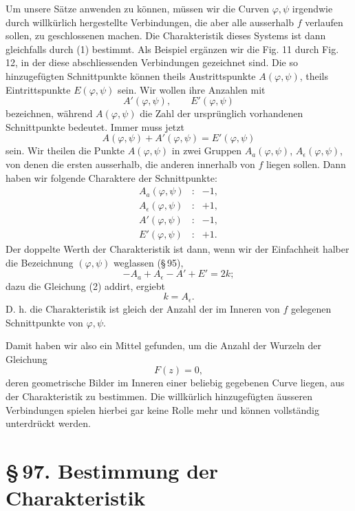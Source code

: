 \documentclass[11pt]{article}
\providecommand{\sect}[2]{\section*{\S\,#1. #2}}
\begin{document}
Um unsere Sätze anwenden zu können, müssen wir die Curven $\varphi,\psi$ irgendwie durch willkürlich hergestellte Verbindungen, die aber alle ausserhalb $f$ verlaufen sollen, zu geschlossenen machen. Die Charakteristik dieses Systems ist dann gleichfalls durch (1) bestimmt. Als Beispiel ergänzen wir die Fig. 11 durch Fig. 12, in der diese abschliessenden Verbindungen gezeichnet sind. Die so hinzugefügten Schnittpunkte können theils Austrittspunkte $A(\varphi,\psi)$, theils Eintrittspunkte $E(\varphi,\psi)$ sein. Wir wollen ihre Anzahlen mit
\[
        A'(\varphi,\psi),\qquad E'(\varphi,\psi)
\]
bezeichnen, während $A(\varphi,\psi)$ die Zahl der ursprünglich vorhandenen Schnittpunkte bedeutet. Immer muss jetzt
\begin{equation}
        A(\varphi,\psi)+A'(\varphi,\psi)=E'(\varphi,\psi)
\tag{2}
\end{equation}
sein. Wir theilen die Punkte $A(\varphi,\psi)$ in zwei Gruppen $A_a(\varphi,\psi)$, $A_\epsilon(\varphi,\psi)$, von denen die ersten ausserhalb, die anderen innerhalb von $f$ liegen sollen. Dann haben wir folgende Charaktere der Schnittpunkte:
\[
\begin{array}{rcl}
A_a(\varphi,\psi)&:&-1,\\
A_\epsilon(\varphi,\psi)&:&+1,\\
A'(\varphi,\psi)&:&-1,\\
E'(\varphi,\psi)&:&+1.
\end{array}
\]
Der doppelte Werth der Charakteristik ist dann, wenn wir der Einfachheit halber die Bezeichnung $(\varphi,\psi)$ weglassen (\S\,95),
\begin{equation}
        -A_a+A_\epsilon-A'+E'=2k;
\tag{3}
\end{equation}
dazu die Gleichung (2) addirt, ergiebt
\begin{equation}
        k=A_\epsilon.
\tag{4}
\end{equation}
D. h. die Charakteristik ist gleich der Anzahl der im Inneren von $f$ gelegenen Schnittpunkte von $\varphi,\psi$.

Damit haben wir also ein Mittel gefunden, um die Anzahl der Wurzeln der Gleichung
\[
        F(z)=0,
\]
deren geometrische Bilder im Inneren einer beliebig gegebenen Curve liegen, aus der Charakteristik zu bestimmen. Die willkürlich hinzugefügten äusseren Verbindungen spielen hierbei gar keine Rolle mehr und können vollständig unterdrückt werden.

\sect{97}{Bestimmung der Charakteristik}
\end{document}
